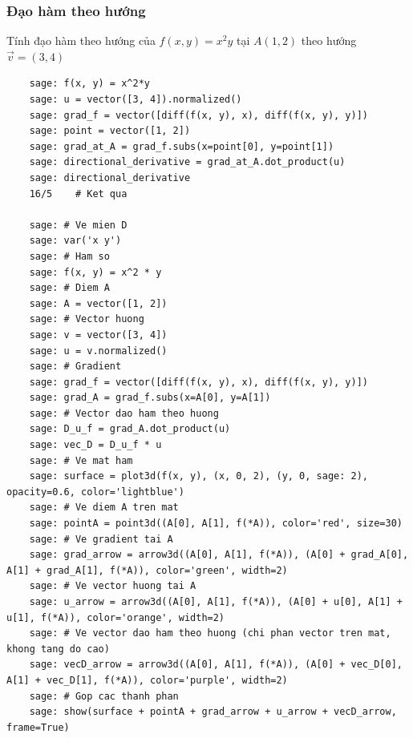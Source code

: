 \subsubsection{Đạo hàm theo hướng}
Tính đạo hàm theo hướng của \( f(x, y) = x^2y \) tại \( A(1, 2) \) theo hướng \( \vec{v} = (3, 4) \)
\begin{lstlisting}
	sage: f(x, y) = x^2*y
	sage: u = vector([3, 4]).normalized()
	sage: grad_f = vector([diff(f(x, y), x), diff(f(x, y), y)])
	sage: point = vector([1, 2])
	sage: grad_at_A = grad_f.subs(x=point[0], y=point[1])
	sage: directional_derivative = grad_at_A.dot_product(u)
	sage: directional_derivative
	16/5	# Ket qua
	
	sage: # Ve mien D
	sage: var('x y')
	sage: # Ham so
	sage: f(x, y) = x^2 * y
	sage: # Diem A
	sage: A = vector([1, 2])
	sage: # Vector huong
	sage: v = vector([3, 4])
	sage: u = v.normalized()
	sage: # Gradient
	sage: grad_f = vector([diff(f(x, y), x), diff(f(x, y), y)])
	sage: grad_A = grad_f.subs(x=A[0], y=A[1])
	sage: # Vector dao ham theo huong
	sage: D_u_f = grad_A.dot_product(u)
	sage: vec_D = D_u_f * u
	sage: # Ve mat ham
	sage: surface = plot3d(f(x, y), (x, 0, 2), (y, 0, sage: 2), opacity=0.6, color='lightblue')
	sage: # Ve diem A tren mat
	sage: pointA = point3d((A[0], A[1], f(*A)), color='red', size=30)
	sage: # Ve gradient tai A
	sage: grad_arrow = arrow3d((A[0], A[1], f(*A)), (A[0] + grad_A[0], A[1] + grad_A[1], f(*A)), color='green', width=2)
	sage: # Ve vector huong tai A
	sage: u_arrow = arrow3d((A[0], A[1], f(*A)), (A[0] + u[0], A[1] + u[1], f(*A)), color='orange', width=2)
	sage: # Ve vector dao ham theo huong (chi phan vector tren mat, khong tang do cao)
	sage: vecD_arrow = arrow3d((A[0], A[1], f(*A)), (A[0] + vec_D[0], A[1] + vec_D[1], f(*A)), color='purple', width=2)
	sage: # Gop cac thanh phan
	sage: show(surface + pointA + grad_arrow + u_arrow + vecD_arrow, frame=True)
	
\end{lstlisting}
